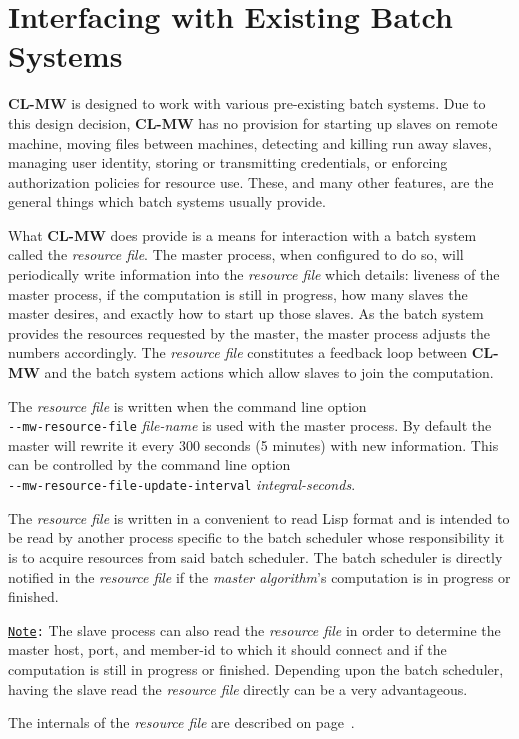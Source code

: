 \documentclass[titlepage,12pt]{book}
\newcommand{\xsmall}{\latexhtml{\small}{}}
\newcommand{\xnormalsize}{\latexhtml{\normalsize}{}}
\newcommand{\clmw}{\xsmall\textbf{CL-MW}\xnormalsize\xspace}
\newcommand{\ma}{\textit{master algorithm}\xspace}
\newcommand{\rfile}{\textit{resource file}\xspace}
\newcommand{\dash}{\texttt{-}}
\newcommand{\OptionV}[2]{\dash\dash\texttt{#1} \textit{#2}}
\newcommand{\Note}{\texttt{\underline{Note}:}\xspace}
\begin{document}
\chapter{Interfacing with Existing Batch Systems}

\clmw is designed to work with various pre-existing batch systems. Due
to this design decision, \clmw has no provision for starting up slaves
on remote machine, moving files between machines, detecting and killing
run away slaves, managing user identity, storing or transmitting
credentials, or enforcing authorization policies for resource use.
These, and many other features, are the general things which batch
systems usually provide.

What \clmw does provide is a means for interaction with a batch system
called the \rfile.  The master process, when configured to do so,
will periodically write information into the \rfile which details:
liveness of the master process, if the computation is still in progress,
how many slaves the master desires, and exactly how to start up those
slaves. As the batch system provides the resources requested by the
master, the master process adjusts the numbers accordingly. The
\rfile constitutes a feedback loop between \clmw and the batch
system actions which allow slaves to join the computation.

The \rfile is written when the command line option\\
\OptionV{mw-resource-file}{file-name} is used with the
master process. By default the master will rewrite it
every 300 seconds (5 minutes) with new information. This
can be controlled by the command line option\\
\OptionV{mw-resource-file-update-interval}{integral-seconds}.

The \rfile is written in a convenient to read Lisp format and is
intended to be read by another process specific to the batch scheduler
whose responsibility it is to acquire resources from said batch
scheduler. The batch scheduler is directly notified in the \rfile
if the {\ma}'s computation is in progress or finished.

\Note The slave process can also read the \rfile in order to determine
the master host, port, and member-id to which it should connect and
if the computation is still in progress or finished.  Depending upon
the batch scheduler, having the slave read the \rfile directly can
be a very advantageous.

The internals of the \rfile are described on
page~\pageref{resource-file}.
\end{document}
